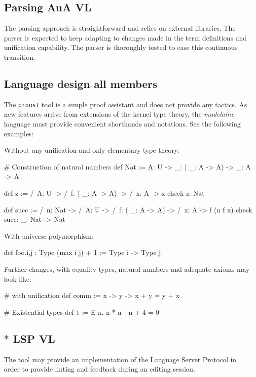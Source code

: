 \documentclass[twocolumn]{article}
\begin{document}
\subsection{Parsing \hfill\scriptsize AuA VL}
The parsing approach is straightforward and relies on external libraries. The
parser is expected to keep adapting to changes made in the term definitions and
unification capability. The parser is thoroughly tested to ease this continuous transition.


\subsection{Language design \hfill\scriptsize all members}
The \texttt{proost} tool is a simple proof assistant and does not provide any
tactics. As new features arrive from extensions of the kernel type theory, the
\emph{madelaine} language must provide convenient shorthands and notations. See
the following examples:

Without any unification and only elementary type theory:
\begin{proost}
# Construction of natural numbers
def Nat := \/ A: U ->
  \/ _: (\/ _: A -> A) -> \/ _: A -> A

def z := /\ A: U ->
  /\ f: (\/ _: A -> A) -> /\ x: A -> x
check z: Nat

def succ := /\ n: Nat -> /\ A: U ->
  /\ f: (\/ _: A -> A) -> /\ x: A ->
  f (n f x)
check succ: \/ _: Nat -> Nat
\end{proost}

With universe polymorphism:
\begin{proost}
def foo.{i,j} : Type (max i j) + 1 := Type i -> Type j
\end{proost}

Further changes, with equality types, natural numbers and adequate axioms may
look like:
\begin{proost}
# with unification
def comm := \/ x -> \/ y -> x + y = y + x

# Existential types
def t := E n, n * n - n + 4 = 0
\end{proost}


\subsection{\(*\) LSP \hfill\scriptsize VL}
The tool may provide an implementation of the Language Server Protocol in
order to provide linting and feedback during an editing session.

\end{document}

